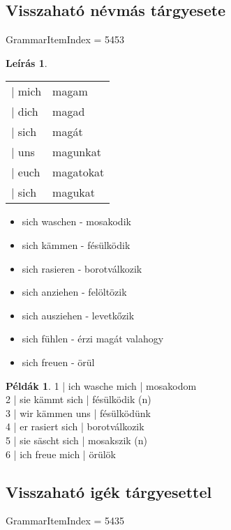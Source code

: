 \documentclass{article}
\theoremstyle{definition}
\newtheorem*{exmp}{Példák}
\newtheorem*{desc}{Leírás}
\begin{document}
\subsection{Visszaható névmás tárgyesete}

GrammarItemIndex = 5453

\begin{desc}
\begin{tabular}{ll}
 | mich & magam \\
 | dich & magad \\
 | sich & magát \\
 | uns & magunkat \\
 | euch & magatokat \\
 | sich & magukat \\
\end{tabular}

\begin{itemize}
\item sich waschen - mosakodik
\item sich kämmen - fésülködik
\item sich rasieren - borotválkozik
\item sich anziehen - felöltözik
\item sich ausziehen - levetkőzik
\item sich fühlen - érzi magát valahogy
\item sich freuen - örül
\end{itemize}
\end{desc}

\begin{exmp}
1 | ich wasche mich | mosakodom\\
2 | sie kämmt sich | fésülködik (n)\\
3 | wir kämmen uns | fésülködünk\\
4 | er rasiert sich | borotválkozik\\
5 | sie säscht sich | mosakszik (n)\\
6 | ich freue mich | örülök\\
\end{exmp}

\subsection{Visszaható igék tárgyesettel}

GrammarItemIndex = 5435
\end{document}

